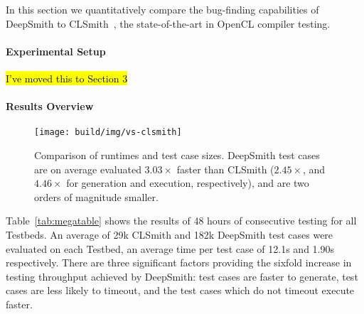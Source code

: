 In this section we quantitatively compare the bug-finding capabilities of DeepSmith to CLSmith~\cite{Lidbury2015a}, the state-of-the-art in OpenCL compiler testing.

\paragraph{Experimental Setup} \hl{I've moved this to Section 3}

\paragraph{Results Overview}

\begin{table*}
  \scriptsize %
  \centering %
  
  \caption{%
    Results from 48 hours of testing using CLSmith and DeepSmith. Testbed \#. as per Table~\ref{tab:platforms}. $\pm$ denotes optimizations off ($-$) vs on ($+$). The remaining columns denote the number of build crash (\textbf{bc}), build timeout (\textbf{bto}), build failure (\textbf{bf}), runtime crash (\textbf{c}), wrong-output (\textbf{w}), and pass (\textbf{\cmark}) results. %
  }
  \label{tab:megatable}
\end{table*}

\begin{figure}
  \centering %
  \texttt{[image: build/img/vs-clsmith]}%
  \vspace{-1em}
  \caption{%
    Comparison of runtimes and test case sizes. DeepSmith test cases are on average evaluated $3.03\times$ faster than CLSmith ($2.45\times$, and $4.46\times$ for generation and execution, respectively), and are two orders of magnitude smaller.
  }%
  \label{fig:vs-clsmith} %
\end{figure}

Table~\ref{tab:megatable} shows the results of 48 hours of consecutive testing for all Testbeds. An average of 29k CLSmith and 182k DeepSmith test cases were evaluated on each Testbed, an average time per test case of 12.1s and 1.90s respectively. There are three significant factors providing the sixfold increase in testing throughput achieved by DeepSmith: test cases are faster to generate, test cases are less likely to timeout, and the test cases which do not timeout execute faster.


